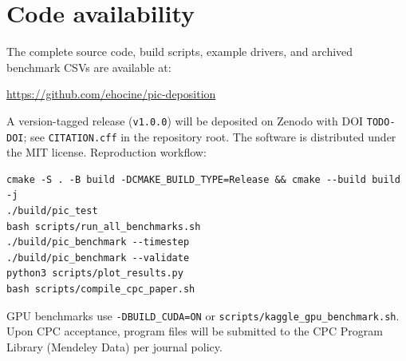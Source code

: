 \section{Code availability}
\label{sec:availability}

The complete source code, build scripts, example drivers, and archived benchmark CSVs are available at:
\begin{center}
\url{https://github.com/ehocine/pic-deposition}
\end{center}
A version-tagged release (\texttt{v1.0.0}) will be deposited on Zenodo with DOI \texttt{TODO-DOI}; see \texttt{CITATION.cff} in the repository root.
The software is distributed under the MIT license.
Reproduction workflow:
\begin{verbatim}
cmake -S . -B build -DCMAKE_BUILD_TYPE=Release && cmake --build build -j
./build/pic_test
bash scripts/run_all_benchmarks.sh
./build/pic_benchmark --timestep
./build/pic_benchmark --validate
python3 scripts/plot_results.py
bash scripts/compile_cpc_paper.sh
\end{verbatim}
GPU benchmarks use \texttt{-DBUILD\_CUDA=ON} or \texttt{scripts/kaggle\_gpu\_benchmark.sh}.
Upon CPC acceptance, program files will be submitted to the CPC Program Library (Mendeley Data) per journal policy.
